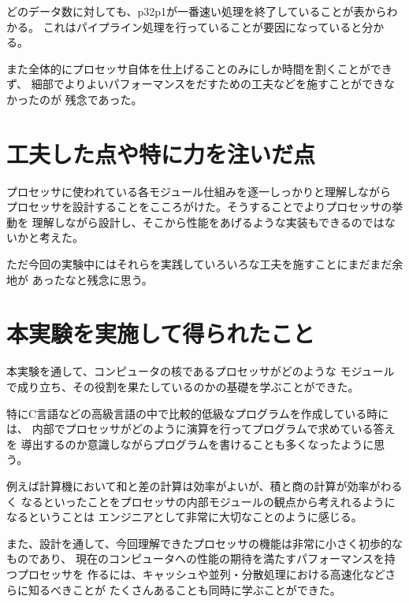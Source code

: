 \documentclass{jarticle}[11pt]
\begin{document}
どのデータ数に対しても、p32p1が一番速い処理を終了していることが表からわかる。
これはパイプライン処理を行っていることが要因になっていると分かる。

また全体的にプロセッサ自体を仕上げることのみにしか時間を割くことができず、
細部でよりよいパフォーマンスをだすための工夫などを施すことができなかったのが
残念であった。



\section{工夫した点や特に力を注いだ点}
\label{sec:工夫した点や特に力を注いだ点}

プロセッサに使われている各モジュール仕組みを逐一しっかりと理解しながら
プロセッサを設計することをこころがけた。そうすることでよりプロセッサの挙動を
理解しながら設計し、そこから性能をあげるような実装もできるのではないかと考えた。

ただ今回の実験中にはそれらを実践していろいろな工夫を施すことにまだまだ余地が
あったなと残念に思う。



\section{本実験を実施して得られたこと}
\label{sec:本実験を実施して得られたこと}

本実験を通して、コンピュータの核であるプロセッサがどのような
モジュールで成り立ち、その役割を果たしているのかの基礎を学ぶことができた。

\vspace{0.2in}

特にC言語などの高級言語の中で比較的低級なプログラムを作成している時には、
内部でプロセッサがどのように演算を行ってプログラムで求めている答えを
導出するのか意識しながらプログラムを書けることも多くなったように思う。

例えば計算機において和と差の計算は効率がよいが、積と商の計算が効率がわるく
なるといったことをプロセッサの内部モジュールの観点から考えれるようになるということは
エンジニアとして非常に大切なことのように感じる。

\vspace{0.2in}

また、設計を通して、今回理解できたプロセッサの機能は非常に小さく初歩的なものであり、
現在のコンピュータへの性能の期待を満たすパフォーマンスを持つプロセッサを
作るには、キャッシュや並列・分散処理における高速化などさらに知るべきことが
たくさんあることも同時に学ぶことができた。
\end{document}

